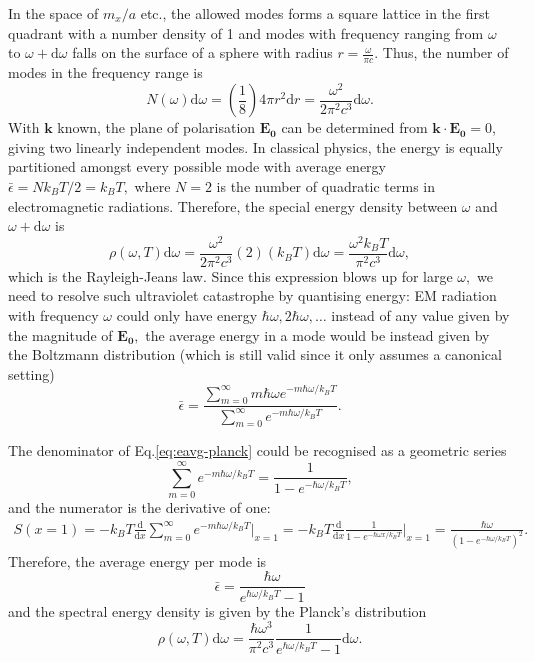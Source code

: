 \documentclass{article}
\begin{document}
In the space of $m_{x}  / a$ etc., the allowed modes forms a square lattice in the first quadrant with a number density of 1 and modes with frequency ranging from $\omega $ to $\omega  + \mathrm{d} \omega $ falls on the surface of a sphere with radius $r = \frac{\omega }{\pi c}$. Thus, the number of modes in the frequency range is
\[
    N(\omega ) \mathrm{d} \omega  = \left( \frac{1}{8} \right) 4 \pi r^{2} \mathrm{d} r
    = \frac{\omega ^{2}}{2 \pi ^{2} c^3} \mathrm{d} \omega . 
\]
With $\mathbf{k} $ known, the plane of polarisation $\mathbf{E_0} $ can be determined from $\mathbf{k} \cdot \mathbf{E_0} = 0$, giving two linearly independent modes. In classical physics, the energy is equally partitioned amongst every possible mode with average energy $\bar{\epsilon} = N k_B T/ 2 = k_{B} T,$ where $N=2$ is the number of quadratic terms in electromagnetic radiations. Therefore, the special energy density between $\omega $ and $\omega + \mathrm{d} \omega $ is 
\[
    \rho (\omega , T) \mathrm{d} \omega = 
    \frac{\omega ^{2}}{2 \pi ^{2} c^3} (2) (k_{B} T) \mathrm{d} \omega
    = \frac{\omega ^{2} k_{B} T}{\pi ^{2} c^{3} } \mathrm{d} \omega ,
\]
which is the Rayleigh-Jeans law. Since this expression blows up for large $\omega ,$ we need to resolve such ultraviolet catastrophe by quantising energy: EM radiation with frequency $\omega $ could only have energy $\hbar \omega , 2 \hbar \omega , \ldots $ instead of any value given by the magnitude of $\mathbf{E_0},$ the average energy in a mode would be instead given by the Boltzmann distribution (which is still valid since it only assumes a canonical setting) 
\begin{equation}
    \bar{\epsilon }
    = \frac{\sum_{m=0}^{\infty} m \hbar \omega e^{-m \hbar \omega / k_{B} T}}{\sum_{m=0}^{\infty} e^{-m \hbar \omega / k_{B} T}}.
    \label{eq:eavg-planck}
\end{equation}

The denominator of Eq.\eqref{eq:eavg-planck} could be recognised as a geometric series 
\[
    \sum_{m=0}^{\infty} e^{-m \hbar \omega / k_{B} T} = 
    \frac{1}{1 - e^{- \hbar \omega / k_{B} T}},
\]
and the numerator is the derivative of one:
\begin{align*}
    S(x=1) = -k_{B} T \frac{\mathrm{d} }{\mathrm{d} x} \sum_{m=0}^{\infty} e^{-m \hbar \omega / k_{B} T} \bigg \rvert_{x = 1}
    = -k_{B} T \frac{\mathrm{d} }{\mathrm{d} x} \frac{1}{1 - e^{- \hbar \omega x / k_{B} T}} \bigg \rvert_{x = 1}
    = \frac{\hbar \omega }{\left(1 - e^{- \hbar \omega  / k_{B} T} \right)^{2} }. 
\end{align*}
Therefore, the average energy per mode is 
\[
    \bar{\epsilon } = \frac{\hbar \omega }{ e^{\hbar \omega  / k_{B} T} - 1}
\]
and the spectral energy density is given by the Planck's distribution
\[
    \rho (\omega ,T) \mathrm{d} \omega = \frac{\hbar \omega ^3 }{\pi ^{2} c^{3} } \frac{1}{e^{\hbar \omega  / k_{B} T} - 1} \mathrm{d}\omega  .
\]
\end{document}
